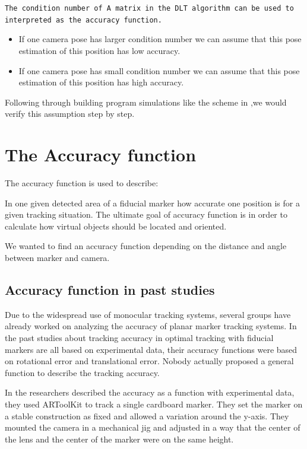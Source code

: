 \texttt{The condition number of A matrix in the DLT algorithm can be used to interpreted as the accuracy function.}
\begin{itemize}
\item If one camera pose has larger condition number we can assume that this pose estimation of this position has low accuracy.
\item If one camera pose has small condition number we can assume that this pose estimation of this position has high accuracy.
\end{itemize}

Following through building program simulations like the scheme in \cite{dynamic_markers}
,we would verify this assumption step by step.  


\section{The Accuracy function}

The accuracy function is used to describe: 

In one given detected area of a fiducial marker how accurate one position is for a given tracking situation. The ultimate goal of accuracy function is in order to
calculate how virtual objects should be located and oriented.

We wanted to find an accuracy function depending on the distance and angle between marker and camera.

\subsection{Accuracy function in past studies}
Due to the widespread use of monocular tracking systems, several groups have already worked on analyzing the accuracy of planar marker tracking systems. 
In the past studies about tracking accuracy in optimal tracking with fiducial markers are all based on experimental data, their accuracy functions were based on rotational error and translational error. Nobody actually proposed a general function to describe the tracking accuracy.  

In \cite{abawi2004accuracy} the researchers described the accuracy as a function with experimental data, they used ARToolKit to track a
single cardboard marker. They set the marker on a
stable construction as fixed and allowed a variation around the
y-axis. They mounted the camera in a mechanical jig
and adjusted in a way that the center of the lens and the
center of the marker were on the same height\cite{abawi2004accuracy}.

